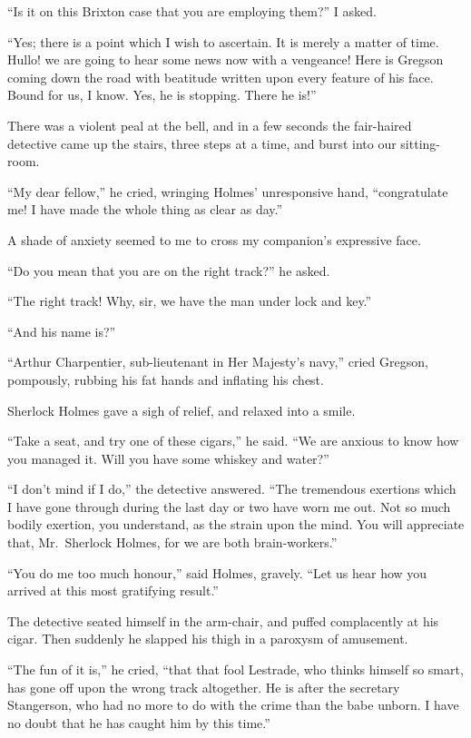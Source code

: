 \documentclass[12pt,english]{book}
\begin{document}
{}``Is it on this Brixton case that you are employing them?'' I
asked.

{}``Yes; there is a point which I wish to ascertain. It is merely
a matter of time. Hullo! we are going to hear some news now with a
vengeance! Here is Gregson coming down the road with beatitude written
upon every feature of his face. Bound for us, I know. Yes, he is stopping.
There he is!''

There was a violent peal at the bell, and in a few seconds the fair-haired
detective came up the stairs, three steps at a time, and burst into
our sitting-room.

{}``My dear fellow,'' he cried, wringing Holmes' unresponsive hand,
{}``congratulate me! I have made the whole thing as clear as day.''

A shade of anxiety seemed to me to cross my companion's expressive
face.

{}``Do you mean that you are on the right track?'' he asked.

{}``The right track! Why, sir, we have the man under lock and key.''

{}``And his name is?''

{}``Arthur Charpentier, sub-lieutenant in Her Majesty's navy,''
cried Gregson, pompously, rubbing his fat hands and inflating his
chest.

Sherlock Holmes gave a sigh of relief, and relaxed into a smile.

{}``Take a seat, and try one of these cigars,'' he said. {}``We
are anxious to know how you managed it. Will you have some whiskey
and water?''

{}``I don't mind if I do,'' the detective answered. {}``The tremendous
exertions which I have gone through during the last day or two have
worn me out. Not so much bodily exertion, you understand, as the strain
upon the mind. You will appreciate that, Mr.\ Sherlock Holmes, for
we are both brain-workers.''

{}``You do me too much honour,'' said Holmes, gravely. {}``Let
us hear how you arrived at this most gratifying result.''

The detective seated himself in the arm-chair, and puffed complacently
at his cigar. Then suddenly he slapped his thigh in a paroxysm of
amusement.

{}``The fun of it is,'' he cried, {}``that that fool Lestrade,
who thinks himself so smart, has gone off upon the wrong track altogether.
He is after the secretary Stangerson, who had no more to do with the
crime than the babe unborn. I have no doubt that he has caught him
by this time.''
\end{document}
